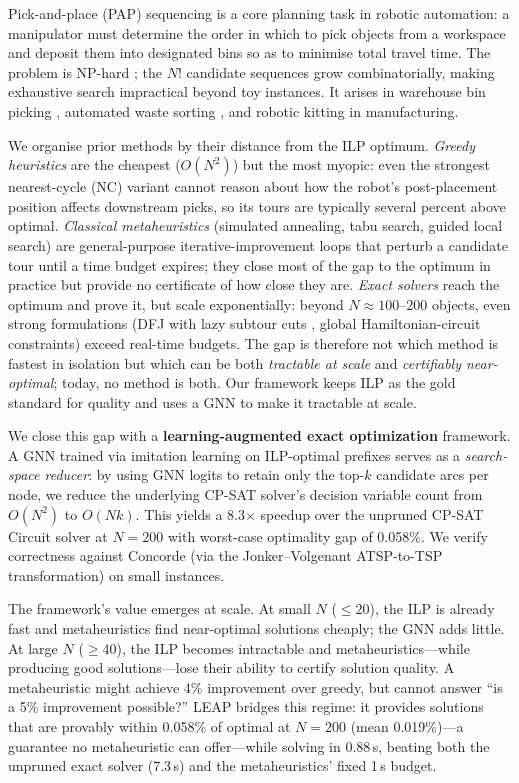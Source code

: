 \documentclass[conference]{IEEEtran}
\begin{document}
Pick-and-place (PAP) sequencing is a core planning task in robotic automation: a manipulator must determine the order in which to pick objects from a workspace and deposit them into designated bins so as to minimise total travel time. The problem is NP-hard \cite{chalasani1996}; the $N!$ candidate sequences grow combinatorially, making exhaustive search impractical beyond toy instances. It arises in warehouse bin picking \cite{cheng2024drl}, automated waste sorting \cite{gundupalli2021sequence, kiyokawa2024challenges}, and robotic kitting in manufacturing.

We organise prior methods by their distance from the ILP optimum. \emph{Greedy heuristics} are the cheapest ($O(N^2)$) but the most myopic: even the strongest nearest-cycle (NC) variant cannot reason about how the robot's post-placement position affects downstream picks, so its tours are typically several percent above optimal. \emph{Classical metaheuristics} (simulated annealing, tabu search, guided local search) are general-purpose iterative-improvement loops that perturb a candidate tour until a time budget expires; they close most of the gap to the optimum in practice but provide no certificate of how close they are. \emph{Exact solvers} reach the optimum and prove it, but scale exponentially: beyond $N\!\approx\!100\text{--}200$ objects, even strong formulations (DFJ with lazy subtour cuts \cite{dantzig1954}, global Hamiltonian-circuit constraints) exceed real-time budgets. The gap is therefore not which method is fastest in isolation but which can be both \emph{tractable at scale} and \emph{certifiably near-optimal}; today, no method is both. Our framework keeps ILP as the gold standard for quality and uses a GNN to make it tractable at scale.

We close this gap with a \textbf{learning-augmented exact optimization} framework. A GNN trained via imitation learning on ILP-optimal prefixes serves as a \emph{search-space reducer}: by using GNN logits to retain only the top-$k$ candidate arcs per node, we reduce the underlying CP-SAT solver's decision variable count from $O(N^2)$ to $O(Nk)$. This yields a 8.3$\times$ speedup over the unpruned CP-SAT Circuit solver at $N{=}200$ with worst-case optimality gap of 0.058\%. We verify correctness against Concorde \cite{applegate2006concorde} (via the Jonker--Volgenant ATSP-to-TSP transformation) on small instances.

The framework's value emerges at scale. At small $N$ (${\le}20$), the ILP is already fast and metaheuristics find near-optimal solutions cheaply; the GNN adds little. At large $N$ (${\ge}40$), the ILP becomes intractable and metaheuristics---while producing good solutions---lose their ability to certify solution quality. A metaheuristic might achieve 4\% improvement over greedy, but cannot answer ``is a 5\% improvement possible?'' LEAP bridges this regime: it provides solutions that are provably within 0.058\% of optimal at $N{=}200$ (mean 0.019\%)---a guarantee no metaheuristic can offer---while solving in 0.88\,s, beating both the unpruned exact solver (7.3\,s) and the metaheuristics' fixed 1\,s budget.
\end{document}
